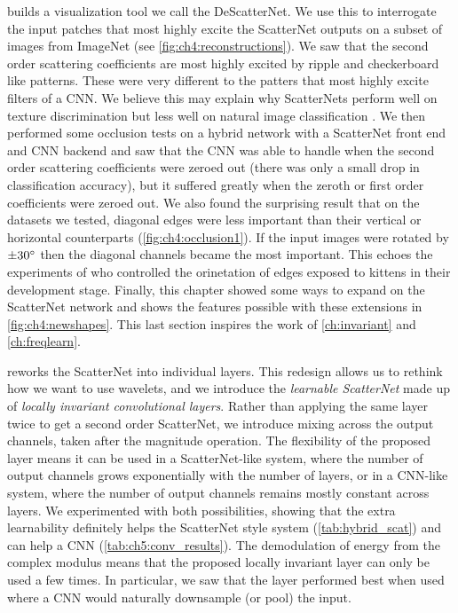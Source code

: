 \textbf{} builds a visualization tool we call the
DeScatterNet. We use this to interrogate the input patches that most highly
excite the ScatterNet outputs on a subset of images from ImageNet (see
\autoref{fig:ch4:reconstructions}). We saw that
the second order scattering coefficients are most highly excited by ripple and
checkerboard like patterns. These were very different to the patters
that most highly excite filters of a CNN. We believe this may explain why
ScatterNets perform well on texture discrimination \cite{bruna_invariant_2013}
but less well on natural image classification \cite{oyallon_deep_2015}. We then
performed some occlusion tests on a hybrid network with a ScatterNet front end
and CNN backend and saw that the CNN was able to handle when the second
order scattering coefficients were zeroed out (there was only a small drop in
classification accuracy), but it suffered greatly when the zeroth or first order
coefficients were zeroed out. We also found the surprising result that on the
datasets we tested, diagonal edges were less important than their vertical or 
horizontal counterparts (\autoref{fig:ch4:occlusion1}). If the input images were
rotated by $\pm 30^{\circ}$ then the diagonal channels became the most important.
This echoes the experiments of
\citeauthor{blakemore_development_1970}\cite{blakemore_development_1970} who
controlled the orinetation of edges exposed to kittens in their development
stage. Finally, this chapter showed some ways to expand on the ScatterNet
network and shows the features possible with these extensions in \autoref{fig:ch4:newshapes}. 
This last section inspires the work of \autoref{ch:invariant}
and \autoref{ch:freqlearn}. 

\textbf{} reworks the ScatterNet into individual layers.
This redesign allows us to rethink how we want to use wavelets, and we introduce
the \emph{learnable ScatterNet} made up of \emph{locally invariant convolutional
layers}. Rather than applying the same layer twice to get a second order
ScatterNet, we introduce mixing across the output channels, taken after the
magnitude operation. The flexibility of the proposed layer means it can be used
in a ScatterNet-like system, where the number of output channels grows
exponentially with the number of layers, or in a CNN-like system, where the
number of output channels remains mostly constant across layers. We experimented
with both possibilities, showing that the extra learnability definitely helps
the ScatterNet style system (\autoref{tab:hybrid_scat}) and can help a CNN
(\autoref{tab:ch5:conv_results}). The demodulation of energy from the complex
modulus means that the proposed locally invariant layer can only be used a few
times. In particular, we saw that the layer performed best when used where a CNN
would naturally downsample (or pool) the input.

